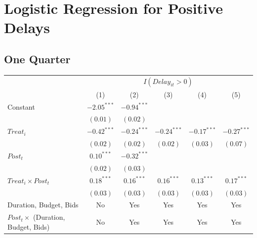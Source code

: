 \documentclass[
]{article}
\begin{document}
\hypertarget{logistic-regression-for-positive-delays}{%
\section{Logistic Regression for Positive
Delays}\label{logistic-regression-for-positive-delays}}

\hypertarget{one-quarter-3}{%
\subsection{One Quarter}\label{one-quarter-3}}

\begin{table}[h]
\begin{center}
\begin{tabular}{l c c c c c}
\hline
 & \multicolumn{5}{c}{$I(Delay_{it}>0)$} \\
\cline{2-6}
 & (1) & (2) & (3) & (4) & (5) \\
\hline
Constant                                   & $-2.05^{***}$ & $-0.94^{***}$ &               &               &               \\
                                           & $(0.01)$      & $(0.02)$      &               &               &               \\
$Treat_i$                                  & $-0.42^{***}$ & $-0.24^{***}$ & $-0.24^{***}$ & $-0.17^{***}$ & $-0.27^{***}$ \\
                                           & $(0.02)$      & $(0.02)$      & $(0.02)$      & $(0.03)$      & $(0.07)$      \\
$Post_t$                                   & $0.10^{***}$  & $-0.32^{***}$ &               &               &               \\
                                           & $(0.02)$      & $(0.03)$      &               &               &               \\
$Treat_i \times Post_t$                    & $0.18^{***}$  & $0.16^{***}$  & $0.16^{***}$  & $0.13^{***}$  & $0.17^{***}$  \\
                                           & $(0.03)$      & $(0.03)$      & $(0.03)$      & $(0.03)$      & $(0.03)$      \\
\hline
Duration, Budget, Bids                     & No            & Yes           & Yes           & Yes           & Yes           \\
$Post_t \times $  (Duration, Budget, Bids) & No            & Yes           & Yes           & Yes           & Yes           \\

\end{tabular}
\end{center}
\end{table}
\end{document}
